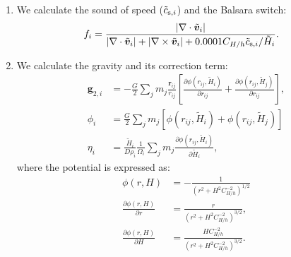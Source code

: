 \documentclass[fleqn,dvipdfmx]{article}
\begin{document}
\begin{enumerate}
\item We calculate the sound of speed ($\tilde{c}_{{\rm s},i}$) and
  the Balsara switch:
  \begin{align}
    f_i &= \frac{|\nabla \cdot \tilde{\bm{v}}_i|}{|\nabla \cdot
      \tilde{\bm{v}}_i| + |\nabla \times \tilde{\bm{v}}_i| + 0.0001
      C_{H/h} \tilde{c}_{{\rm s},i} / \tilde{H}_i}.
  \end{align}

\item We calculate the gravity and its correction term:
  \begin{align}
    \bm{g}_{2,i} &= - \frac{G}{2} \sum_j m_j
    \frac{\bm{r}_{ij}}{r_{ij}} \left[ \frac{\partial
        \phi(r_{ij},\tilde{H}_i)}{\partial r_{ij}} + \frac{\partial
        \phi(r_{ij},\tilde{H}_j)}{\partial r_{ij}} \right], \\
    \phi_i &= \frac{G}{2} \sum_j m_j \left[ \phi(r_{ij},\tilde{H}_i) +
      \phi(r_{ij},\tilde{H}_j) \right] \\
    \eta_i &= \frac{\tilde{H}_i}{D\rho_i} \frac{1}{\Omega_i} \sum_j
    m_j \frac{\partial \phi(r_{ij},\tilde{H}_i)}{\partial
      \tilde{H}_i},
  \end{align}
  where the potential is expressed as:
  \begin{align}
    \phi(r,H) &= - \frac{1}{\left( r^2 + H^2 C_{H/h}^{-2}
      \right)^{1/2}} \\
    \frac{\partial \phi(r,H)}{\partial r} &= \frac{r}{\left( r^2 + H^2
      C_{H/h}^{-2} \right)^{3/2}}, \\
    \frac{\partial \phi(r,H)}{\partial H} &=
    \frac{HC_{H/h}^{-2}}{\left( r^2 + H^2 C_{H/h}^{-2} \right)^{3/2}}.
  \end{align}


\end{enumerate}
\end{document}
